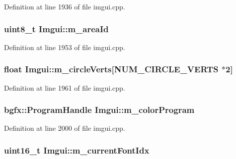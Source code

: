 Definition at line 1936 of file imgui.\+cpp.

\hypertarget{struct_imgui_a49f3ba72d556e833159d3c53055e7ac5}{
\subsubsection[{m\+\_\+area\+Id}]{\setlength{\rightskip}{0pt plus 5cm}uint8\+\_\+t Imgui\+::m\+\_\+area\+Id}}\label{struct_imgui_a49f3ba72d556e833159d3c53055e7ac5}


Definition at line 1953 of file imgui.\+cpp.

\hypertarget{struct_imgui_ab3588c2ae89dd63593b4b1e3c8de8d6a}{
\subsubsection[{m\+\_\+circle\+Verts}]{\setlength{\rightskip}{0pt plus 5cm}float Imgui\+::m\+\_\+circle\+Verts\mbox{[}{\bf N\+U\+M\+\_\+\+C\+I\+R\+C\+L\+E\+\_\+\+V\+E\+R\+T\+S} $\ast$2\mbox{]}}}\label{struct_imgui_ab3588c2ae89dd63593b4b1e3c8de8d6a}


Definition at line 1961 of file imgui.\+cpp.

\hypertarget{struct_imgui_ac3ba743de6b188ea34a5dff983c2f532}{
\subsubsection[{m\+\_\+color\+Program}]{\setlength{\rightskip}{0pt plus 5cm}bgfx\+::\+Program\+Handle Imgui\+::m\+\_\+color\+Program}}\label{struct_imgui_ac3ba743de6b188ea34a5dff983c2f532}


Definition at line 2000 of file imgui.\+cpp.

\hypertarget{struct_imgui_ae5864284805ff93aa9f823e4400f9699}{
\subsubsection[{m\+\_\+current\+Font\+Idx}]{\setlength{\rightskip}{0pt plus 5cm}uint16\+\_\+t Imgui\+::m\+\_\+current\+Font\+Idx}}\label{struct_imgui_ae5864284805ff93aa9f823e4400f9699}


